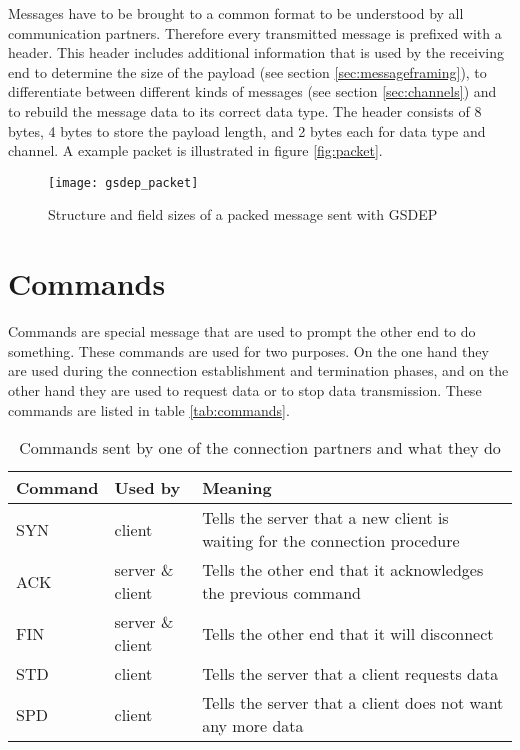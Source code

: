 Messages have to be brought to a common format to be understood by all communication partners. Therefore every transmitted message is prefixed with a header. This header includes additional information that is used by the receiving end to determine the size of the payload (see section \vref{sec:messageframing}), to differentiate between different kinds of messages (see section \vref{sec:channels}) and to rebuild the message data to its correct data type. The header consists of 8 bytes, 4 bytes to store the payload length, and 2 bytes each for data type and channel. A example packet is illustrated in figure \vref{fig:packet}.

\begin{figure}[h]
    \centering
    \texttt{[image: gsdep\_packet]}
    \caption{Structure and field sizes of a packed message sent with GSDEP}
    \label{fig:packet}
\end{figure}

\section{Commands}
\label{sec:networking_command}

Commands are special message that are used to prompt the other end to do something. These commands are used for two purposes. On the one hand they are used during the connection establishment and termination phases, and on the other hand they are used to request data or to stop data transmission. These commands are listed in table \vref{tab:commands}.

\begin{table}[h]
    \centering
    \begin{tabular}{| l | l | p{5cm} |}
    \hline
    \textbf{Command} & \textbf{Used by} & \textbf{Meaning} \\ \hline
    SYN & client & Tells the server that a new client is waiting for the connection procedure \\ \hline
    ACK & server \& client & Tells the other end that it acknowledges the previous command \\ \hline
    FIN & server \& client & Tells the other end that it will disconnect \\ \hline
    STD & client & Tells the server that a client requests data\\ \hline
    SPD & client & Tells the server that a client does not want any more data\\
    \hline
    \end{tabular}
    \caption{Commands sent by one of the connection partners and what they do}
    \label{tab:commands}
\end{table}

